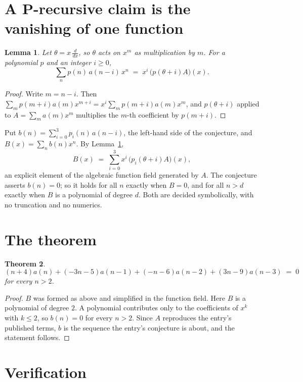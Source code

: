 \documentclass[11pt,a4paper]{article}
\theoremstyle{plain}
\newtheorem{theorem}{Theorem}
\newtheorem{lemma}[theorem]{Lemma}
\theoremstyle{definition}
\begin{document}
\section{A P-recursive claim is the vanishing of one function}

\begin{lemma}\label{lem:theta}
Let $\theta=x\,\frac{d}{dx}$, so $\theta$ acts on $x^m$ as multiplication by $m$. For a
polynomial $p$ and an integer $i\ge0$,
\[
\sum_{n} p(n)\,a(n-i)\,x^{n}\;=\;x^{i}\,\bigl(p(\theta+i)A\bigr)(x).
\]
\end{lemma}

\begin{proof}
Write $m=n-i$. Then $\sum_m p(m+i)a(m)x^{m+i}=x^i\sum_m p(m+i)a(m)x^m$, and $p(\theta+i)$
applied to $A=\sum_m a(m)x^m$ multiplies the $m$-th coefficient by $p(m+i)$.
\end{proof}

Put $b(n)=\sum_{i=0}^{3}p_i(n)\,a(n-i)$, the left-hand side of the conjecture, and
$B(x)=\sum_n b(n)x^n$. By Lemma~\ref{lem:theta},
\[
B(x)\;=\;\sum_{i=0}^{3}x^{i}\,\bigl(p_i(\theta+i)A\bigr)(x),
\]
an explicit element of the algebraic function field generated by $A$. The conjecture asserts
$b(n)=0$; so it holds for all $n$ exactly when $B=0$, and for all $n>d$ exactly when $B$ is a
polynomial of degree $d$. Both are decided symbolically, with no truncation and no numerics.

\section{The theorem}

\begin{theorem}
\[
\left(n + 4\right)a(n) + \left(- 3 n - 5\right)a(n-1) + \left(- n - 6\right)a(n-2) + \left(3 n - 9\right)a(n-3)\;=\;0
\]
for every $n>2$.
\end{theorem}

\begin{proof}
$B$ was formed as above and simplified in the function field. Here $B$ is a polynomial of degree $2$. A polynomial contributes only to the coefficients of $x^k$ with $k\le2$, so $b(n)=0$ for every $n>2$. Since $A$ reproduces the
entry's published terms, $b$ is the sequence the entry's conjecture is about, and the statement
follows.
\end{proof}

\section{Verification}
\end{document}
